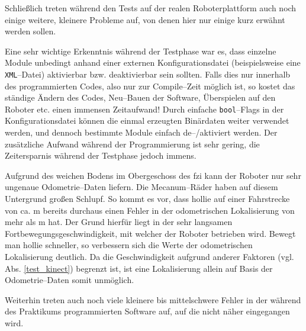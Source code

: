 Schließlich treten während den Tests auf der realen Roboterplattform auch noch einige weitere, kleinere Probleme auf, von denen hier nur einige kurz erwähnt werden sollen.

Eine sehr wichtige Erkenntnis während der Testphase war es, dass einzelne Module unbedingt anhand einer externen Konfigurationsdatei (beispielsweise eine \lstinline{XML}--Datei) aktivierbar bzw. deaktivierbar sein sollten.
Falls dies nur innerhalb des programmierten Codes, also nur zur Compile--Zeit möglich ist, so kostet das ständige Ändern des Codes, Neu--Bauen der Software, Überspielen auf den Roboter etc. einen immensen Zeitaufwand!
Durch einfache \lstinline{bool}--Flags in der Konfigurationsdatei können die einmal erzeugten Binärdaten weiter verwendet werden, und dennoch bestimmte Module einfach de--/aktiviert werden.
Der zusätzliche Aufwand während der Programmierung ist sehr gering, die Zeitersparnis während der Testphase jedoch immens.

Aufgrund des weichen Bodens im Obergeschoss des \gls{fzi} kann der Roboter nur sehr ungenaue Odometrie--Daten liefern.
Die Mecanum--Räder haben auf diesem Untergrund großen Schlupf.
So kommt es vor, dass \gls{hollie} auf einer Fahrstrecke von ca. \unit[8]{m} bereits durchaus einen Fehler in der odometrischen Lokalisierung von mehr als \unit[2]{m} hat.
Der Grund hierfür liegt in der sehr langsamen Fortbewegungsgeschwindigkeit, mit welcher der Roboter betrieben wird.
Bewegt man \gls{hollie} schneller, so verbessern sich die Werte der odometrischen Lokalisierung deutlich.
Da die Geschwindigkeit aufgrund anderer Faktoren (vgl. Abs. \ref{test_kinect}) begrenzt ist, ist eine Lokalisierung allein auf Basis der Odometrie--Daten somit unmöglich.

Weiterhin treten auch noch viele kleinere bis mittelschwere Fehler in der während des Praktikums programmierten Software auf, auf die nicht näher eingegangen wird.


